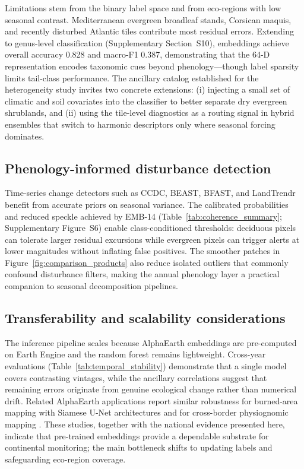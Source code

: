 \documentclass[utf8]{FrontiersinHarvard}
\begin{document}
Limitations stem from the binary label space and from eco-regions with low seasonal contrast. Mediterranean evergreen broadleaf stands, Corsican maquis, and recently disturbed Atlantic tiles contribute most residual errors. Extending to genus-level classification (Supplementary Section~S10), embeddings achieve overall accuracy 0.828 and macro-F1 0.387, demonstrating that the 64-D representation encodes taxonomic cues beyond phenology—though label sparsity limits tail-class performance. The ancillary catalog established for the heterogeneity study invites two concrete extensions: (i) injecting a small set of climatic and soil covariates into the classifier to better separate dry evergreen shrublands, and (ii) using the tile-level diagnostics as a routing signal in hybrid ensembles that switch to harmonic descriptors only where seasonal forcing dominates.

\subsection{Phenology-informed disturbance detection}
Time-series change detectors such as CCDC, BEAST, BFAST, and LandTrendr \citep{Zhu2014,Zhao2019,Verbesselt2010a,Verbesselt2010b,Kennedy2010,Kennedy2018} benefit from accurate priors on seasonal variance. The calibrated probabilities and reduced speckle achieved by EMB-14 (Table~\ref{tab:coherence_summary}; Supplementary Figure~S6) enable class-conditioned thresholds: deciduous pixels can tolerate larger residual excursions while evergreen pixels can trigger alerts at lower magnitudes without inflating false positives. The smoother patches in Figure~\ref{fig:comparison_products} also reduce isolated outliers that commonly confound disturbance filters, making the annual phenology layer a practical companion to seasonal decomposition pipelines.

\subsection{Transferability and scalability considerations}
The inference pipeline scales because AlphaEarth embeddings are pre-computed on Earth Engine and the random forest remains lightweight. Cross-year evaluations (Table~\ref{tab:temporal_stability}) demonstrate that a single model covers contrasting vintages, while the ancillary correlations suggest that remaining errors originate from genuine ecological change rather than numerical drift. Related AlphaEarth applications report similar robustness for burned-area mapping with Siamese U-Net architectures \citep{Seydi2025AlphaEarthBurnedArea} and for cross-border physiognomic mapping \citep{Houriez2025AEFDataGen}. These studies, together with the national evidence presented here, indicate that pre-trained embeddings provide a dependable substrate for continental monitoring; the main bottleneck shifts to updating labels and safeguarding eco-region coverage.
\end{document}
